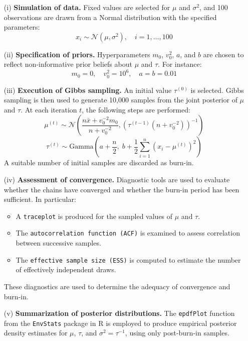 \documentclass[]{article}
\begin{document}
\begin{enumerate}
	\item[(i)] \textbf{Simulation of data.} Fixed values are selected for $\mu$ and $\sigma^2$, and 100 observations are drawn from a Normal distribution with the specified parameters:
	$$
	x_i \sim \mathcal{N}(\mu, \sigma^2), \quad i = 1, \ldots, 100
	$$
	
	\item[(ii)] \textbf{Specification of priors.} Hyperparameters $m_0$, $v_0^2$, $a$, and $b$ are chosen to reflect non-informative prior beliefs about $\mu$ and $\tau$. For instance:
	$$
	m_0 = 0, \quad v_0^2 = 10^6, \quad a = b = 0.01
	$$
	
	\item[(iii)] \textbf{Execution of Gibbs sampling.} An initial value $\tau^{(0)}$ is selected. Gibbs sampling is then used to generate 10{,}000 samples from the joint posterior of $\mu$ and $\tau$. At each iteration $t$, the following steps are performed:
	$$
	\mu^{(t)} \sim \mathcal{N}\left( \frac{n \bar{x} + v_0^{-2} m_0}{n + v_0^{-2}}, \left(\tau^{(t-1)}(n + v_0^{-2})\right)^{-1} \right)
	$$
	$$
	\tau^{(t)} \sim \text{Gamma} \left( a + \frac{n}{2}, \; b + \frac{1}{2} \sum_{i=1}^n (x_i - \mu^{(t)})^2 \right)
	$$
	A suitable number of initial samples are discarded as burn-in.
	
	\item[(iv)] \textbf{Assessment of convergence.} Diagnostic tools are used to evaluate whether the chains have converged and whether the burn-in period has been sufficient. In particular:
	\begin{itemize}
		\item A \texttt{traceplot} is produced for the sampled values of $\mu$ and $\tau$.
		\item The \texttt{autocorrelation function (ACF)} is examined to assess correlation between successive samples.
		\item The \texttt{effective sample size (ESS)} is computed to estimate the number of effectively independent draws.
	\end{itemize}
	These diagnostics are used to determine the adequacy of convergence and burn-in.
	
	\item[(v)] \textbf{Summarization of posterior distributions.} The \texttt{epdfPlot} function from the \texttt{EnvStats} package in R is employed to produce empirical posterior density estimates for $\mu$, $\tau$, and $\sigma^2 = \tau^{-1}$, using only post-burn-in samples.
\end{enumerate}
\end{document}
